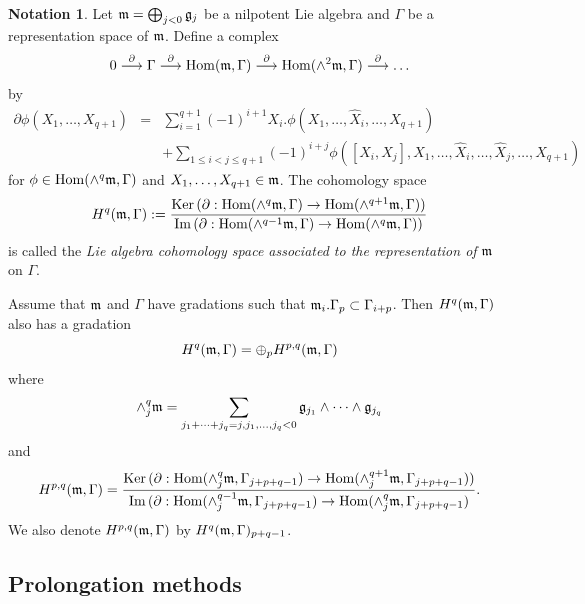 \documentclass[12pt]{amsart}
\theoremstyle{plain}
\theoremstyle{definition}
\newtheorem{notation} [theorem]  {Notation}
\def\Hom{\operatorname{Hom}}
\begin{document}
\begin{notation} Let $\frak m=\bigoplus_{j <0} \frak g_j$ be a nilpotent Lie algebra and $\Gamma$ be a representation space of $\frak m$.
Define a complex
\begin{eqnarray*}
0 \stackrel{\partial}{\longrightarrow} \Gamma \stackrel{\partial}{\longrightarrow} \Hom( \frak m, \Gamma) \stackrel{\partial}{\longrightarrow} \Hom(\wedge^2 \frak m  ,\Gamma  ) \stackrel{\partial}{\longrightarrow} \dots
\end{eqnarray*}
by
\begin{eqnarray*}
\partial \phi (X_1, \dots,  X_{q+1}) &=& \sum_{i=1}^{q+1} (-1)^{i+1}X_i.\phi(X_1, \dots,\hat X_i, \dots , X_{q+1}) \\
&& + \sum_{1 \leq i<j \leq q+1} (-1)^{i+j} \phi([X_i, X_j], X_1, \dots, \hat X_i, \dots, \hat X_j , \dots , X_{q+1})
\end{eqnarray*}
 for $\phi \in \Hom(\wedge^q \frak m, \Gamma)$ and $X_1, \dots, X_{q+1} \in \frak m$.
The cohomology space
$$H^{q}(\frak m, \Gamma):=\frac{\text{Ker}\, (\partial : \Hom(\wedge^q \frak m  , \Gamma) \rightarrow \Hom(\wedge^{q+1}\frak m,   \Gamma))}
{\text{Im}\, (\partial : \Hom( \wedge^{q-1}\frak m ,\Gamma) \rightarrow \Hom(\wedge^q\frak m, \Gamma))}
$$ is called the {\it Lie algebra cohomology space associated to the representation of} $\frak m$ on $\Gamma$.

Assume that $\frak m$ and $\Gamma$ have  gradations such that $\frak m_i.\Gamma_p \subset \Gamma_{i+p}$.  Then $H^q(\frak m, \Gamma)$ also has a gradation
$$H^q(\frak m, \Gamma) = \oplus_{p } H^{p,q}(\frak m, \Gamma)$$
where
$$\wedge^q_j\frak m =\sum_{j_1+\dots+j_q=j, j_1,\dots, j_q <0} \frak g_{j_1} \wedge \dots \wedge \frak g_{j_q}$$
and
\begin{eqnarray*}
H^{p,q}(\frak m, \Gamma) = \frac{\text{Ker}\,(\partial :  \Hom(\wedge^q_j \frak m , \Gamma_{j+p+q-1}) \rightarrow \Hom(\wedge^{q+1}_j \frak m, \Gamma_{j+p+q-1}))}
{\text{Im}\,  (\partial :  \Hom(\wedge^{q-1}_j \frak m, \Gamma_{j+p+q-1}) \rightarrow \Hom(\wedge^{q }_j \frak m, \Gamma_{j+p+q-1})}.
\end{eqnarray*}
We also denote $H^{p,q}(\frak m, \Gamma)$ by $H^q(\frak m,  \Gamma)_{p+q-1}$.
\end{notation}


 \subsection{Prolongation methods} \label{sect:prolongation methods}
\end{document}
